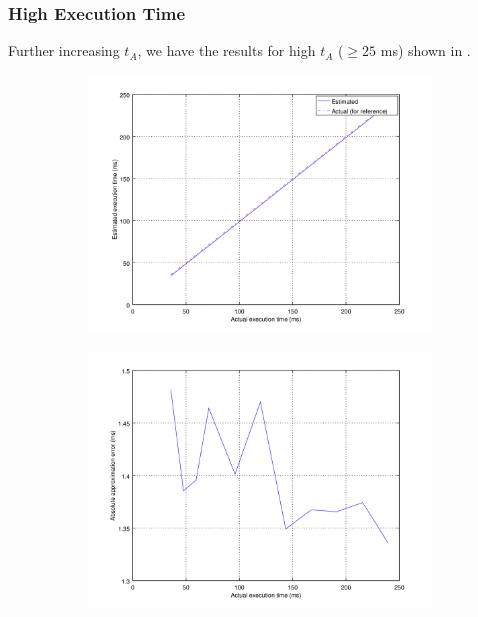 \subsubsection{High Execution Time}

Further increasing $t_A$, we have the results for high $t_A$ ($\geq 25$ ms) shown in .

\begin{figure}[ht!]
	\center
	\begin{subfigure}{0.8\linewidth}
	\center
	\includegraphics[width=\linewidth]{fig/hightaest.png}
	\end{subfigure}
	\begin{subfigure}{0.45\linewidth}
	\center
	\includegraphics[width=\linewidth]{fig/highabstaerr.png}

\end{subfigure}
\end{figure}
